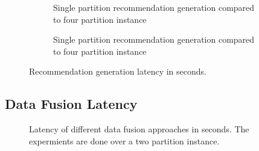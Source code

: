 \begin{figure}[ht!]
    \centering
    \begin{subfigure}{\textwidth}
        \centering
        
        \caption{Single partition recommendation generation compared to four partition instance}\label{a--1}
    \end{subfigure}\qquad

    \begin{subfigure}{\textwidth}
        \centering
        
        \caption{Single partition recommendation generation compared to four partition instance}\label{b--1}
    \end{subfigure}\qquad
    
    \caption{Recommendation generation latency in seconds.}
    \end{figure}

\subsection{Data Fusion Latency}
\label{subsec:data-fusion-latency}
\begin{figure}[ht!]
    \centering
    
    \caption{Latency of different data fusion approaches in seconds. The expermients are done over a two partition instance.}
    \label{plot:data-fusion-boxplot}
\end{figure}
